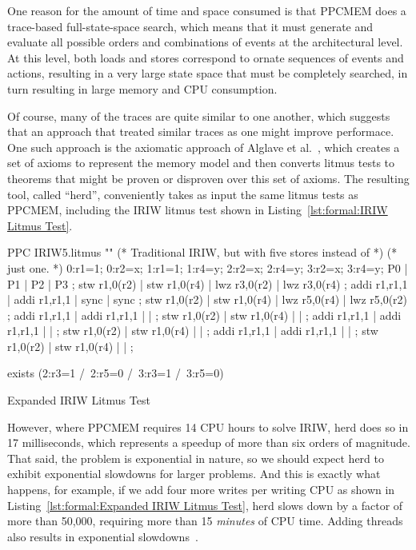One reason for the amount of time and space consumed is that PPCMEM does
a trace-based full-state-space search, which means that it must generate
and evaluate all possible orders and combinations of events at the
architectural level.
At this level, both loads and stores correspond to ornate sequences
of events and actions, resulting in a very large state space that must
be completely searched, in turn resulting in large memory and CPU
consumption.

Of course, many of the traces are quite similar to one another, which
suggests that an approach that treated similar traces as one might
improve performace.
One such approach is the axiomatic approach of
Alglave et al.~\cite{Alglave:2014:HCM:2594291.2594347},
which creates a set of axioms to represent the memory model and then
converts litmus tests to theorems that might be proven or disproven
over this set of axioms.
The resulting tool, called ``herd'',  conveniently takes as input the
same litmus tests as PPCMEM, including the IRIW litmus test shown in
Listing~\ref{lst:formal:IRIW Litmus Test}.

\begin{listing}[tb]
\begin{fcvlabel}
\begin{VerbatimL}[commandchars=\%\@\$]
PPC IRIW5.litmus
""
(* Traditional IRIW, but with five stores instead of *)
(* just one.                                         *)
{
0:r1=1; 0:r2=x;
1:r1=1;         1:r4=y;
        2:r2=x; 2:r4=y;
        3:r2=x; 3:r4=y;
}
P0           | P1           | P2           | P3           ;
stw r1,0(r2) | stw r1,0(r4) | lwz r3,0(r2) | lwz r3,0(r4) ;
addi r1,r1,1 | addi r1,r1,1 | sync         | sync         ;
stw r1,0(r2) | stw r1,0(r4) | lwz r5,0(r4) | lwz r5,0(r2) ;
addi r1,r1,1 | addi r1,r1,1 |              |              ;
stw r1,0(r2) | stw r1,0(r4) |              |              ;
addi r1,r1,1 | addi r1,r1,1 |              |              ;
stw r1,0(r2) | stw r1,0(r4) |              |              ;
addi r1,r1,1 | addi r1,r1,1 |              |              ;
stw r1,0(r2) | stw r1,0(r4) |              |              ;

exists
(2:r3=1 /\ 2:r5=0 /\ 3:r3=1 /\ 3:r5=0)
\end{VerbatimL}
\end{fcvlabel}
\caption{Expanded IRIW Litmus Test}
\label{lst:formal:Expanded IRIW Litmus Test}
\end{listing}

However, where PPCMEM requires 14 CPU hours to solve IRIW, herd does so
in 17 milliseconds, which represents a speedup of more than six orders
of magnitude.
That said, the problem is exponential in nature, so we should expect
herd to exhibit exponential slowdowns for larger problems.
And this is exactly what happens, for example, if we add four more writes
per writing CPU as shown in
Listing~\ref{lst:formal:Expanded IRIW Litmus Test},
herd slows down by a factor of more than 50,000, requiring more than
15 \emph{minutes} of CPU time.
Adding threads also results in exponential
slowdowns~\cite{PaulEMcKenney2014weakaxiom}.

